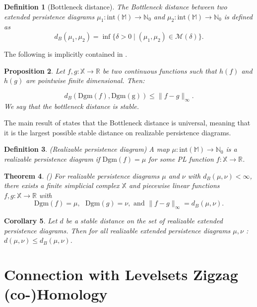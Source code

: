 \documentclass[11pt]{article}
\newtheorem{theorem}{Theorem}[section]
\newtheorem{proposition}[theorem]{Proposition}
\newtheorem{corollary}[theorem]{Corollary}
\newtheorem{definition}[theorem]{Definition}
\theoremstyle{remark}
\newcommand{\N}{\mathbb{N}}
\newcommand{\R}{\mathbb{R}}
\newcommand{\X}{\mathbb{X}}
\newcommand{\M}{\mathbb{M}}
\begin{document}
\begin{definition}[Bottleneck distance]
The \emph{Bottleneck distance} between two extended persistence diagrams $\mu_1:\mathrm{int}(\M)\rightarrow \N_0$ and $\mu_2:\mathrm{int}(\M)\rightarrow \N_0$ is defined as $$d_B(\mu_1,\mu_2)=\inf\{\delta>0\mid (\mu_1,\mu_2)\in\mathcal{M}(\delta)\}.$$
\end{definition}

The following is implicitly contained in \cite{bauer2020universality}. 

\begin{proposition}

Let $f,g : \mathbb{X} \longrightarrow \R$ be two continuous functions such that $h(f)$ and $h(g)$ are pointwise finite dimensional. Then:

\[d_B(\mathrm{Dgm}(f),\mathrm{Dgm(g)}) \leq \|f-g\|_\infty.\]
We say that the bottleneck distance is stable.
\end{proposition}

\noindent The main result of \cite{bauer2020universality} states that the Bottleneck distance is universal, meaning that it is the largest possible stable
distance on realizable persistence diagrams.

\begin{definition}(Realizable persistence diagram) A map $\mu:\mathrm{int}(\M)\rightarrow\N_0$ 
is a \emph{realizable persistence diagram} if $\mathrm{Dgm}(f)=\mu$ for some PL function $f:\X\rightarrow\R$. 
\end{definition}



\begin{theorem}(\autocite[Theorem~1.1]{bauer2020universality})
For realizable persistence diagrams $\mu$ and $\nu$ with $d_B(\mu, \nu)<\infty$, there
exists a finite simplicial complex $\X$ and piecewise linear functions $f,g : \X\rightarrow\R$ with
$$\mathrm{Dgm}(f)=\mu, \text{ } \mathrm{Dgm}(g)=\nu, \text{ and } \lVert f-g \rVert_\infty = d_B(\mu, \nu).$$
\end{theorem}

\begin{corollary}
Let $d$ be a stable distance on the set of realizable extended persistence diagrams. Then for all realizable extended persistence diagrams $\mu, \nu$ : $d(\mu, \nu) \leq d_B(\mu, \nu)$.
\end{corollary}






\section{Connection with Levelsets Zigzag (co-)Homology}
\label{connection}
\end{document}
